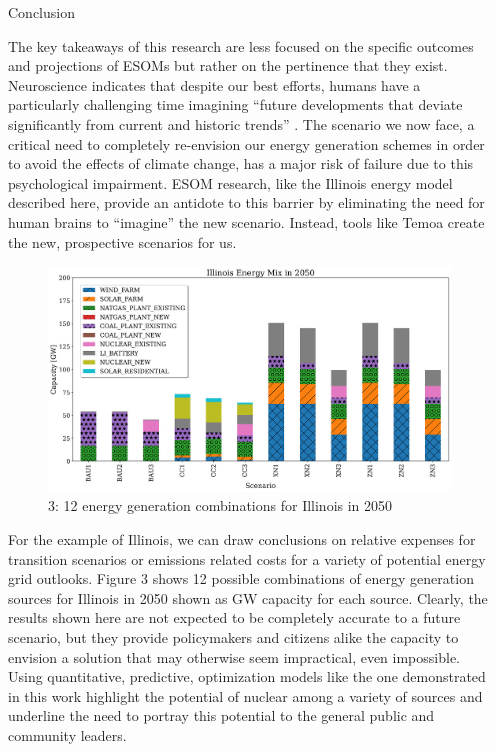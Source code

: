\documentclass[final]{beamer}
\newlength{\sepwid}
\newlength{\onecolwid}
\newlength{\threecolwid}
\begin{document}
\begin{frame}[t]
\begin{columns}[t,totalwidth=\threecolwid]
\begin{column}{\sepwid}\end{column} %

\begin{column}{\onecolwid} %

\begin{block}{Conclusion}
\vspace{0.7em}

The key takeaways of this research are less focused on the specific outcomes and projections of ESOMs but rather on the pertinence that they exist. Neuroscience indicates that despite our best efforts, humans have a particularly challenging time imagining ``future developments that deviate significantly from current and historic trends'' \cite{psych}. The scenario we now face, a critical need to completely re-envision our energy generation schemes in order to avoid the effects of climate change, has a major risk of failure due to this psychological impairment. ESOM research, like the Illinois energy model described here, provide an antidote to this barrier by eliminating the need for human brains to ``imagine'' the new scenario. Instead, tools like Temoa create the new, prospective scenarios for us.

\begin{figure}[h!]
	\label{fig:energy_mix_2050}
	\includegraphics[width=0.9\linewidth]{energy_mix_2050.jpg}
	\caption{3: 12 energy generation combinations for Illinois in 2050 \cite{dotson}}
\end{figure}

For the example of Illinois, we can draw conclusions on relative expenses for transition scenarios or emissions related costs for a variety of potential energy grid outlooks. Figure 3 shows 12 possible combinations of energy generation sources for Illinois in 2050 shown as GW capacity for each source. Clearly, the results shown here are not expected to be completely accurate to a future scenario, but they provide policymakers and citizens alike the capacity to envision a solution that may otherwise seem impractical, even impossible. Using quantitative, predictive, optimization models like the one demonstrated in this work highlight the potential of nuclear among a variety of sources and underline the need to portray this potential to the general public and community leaders.


\end{block}
\end{column}
\end{columns}
\end{frame}
\end{document}
